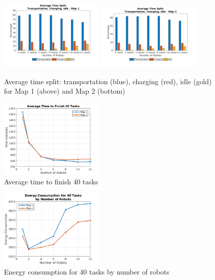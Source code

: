 \documentclass[journal]{IEEEtran}
\begin{document}
\begin{figure}[h]
	\centering
	\includegraphics[width=0.45\textwidth]{resources/Graphs-paper/graph7_1.png}
	\label{fig:trans_charg_idle}
	\includegraphics[width=0.45\textwidth]{resources/Graphs-paper/graph7_2.png}
	\caption{Average time split: transportation (blue), charging (red), idle (gold) for Map 1 (above) and Map 2 (bottom)}
	\label{fig:trans_charg_idle}
\end{figure}


\begin{figure}[h]
	\centering
	\includegraphics[width=0.45\textwidth]{resources/Graphs-paper/graph6.png}
	\caption{Average time to finish 40 tasks}
	\label{fig:time_to_finish_40_tasks}
\end{figure}

\begin{figure}[h]
	\centering
	\includegraphics[width=0.45\textwidth]{resources/Graphs-paper/graph8.png}
	\caption{Energy consumption for 40 tasks by number of robots}
	\label{fig:energy_consumption}
\end{figure}
\end{document}
